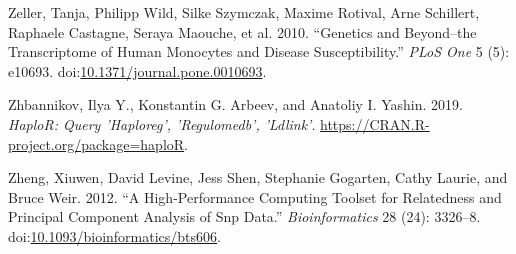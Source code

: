 \documentclass[]{DissertateOSU}
\begin{document}
\hypertarget{ref-Zeller_2010}{}
Zeller, Tanja, Philipp Wild, Silke Szymczak, Maxime Rotival, Arne
Schillert, Raphaele Castagne, Seraya Maouche, et al. 2010. ``Genetics
and Beyond--the Transcriptome of Human Monocytes and Disease
Susceptibility.'' \emph{PLoS One} 5 (5): e10693.
doi:\href{https://doi.org/10.1371/journal.pone.0010693}{10.1371/journal.pone.0010693}.

\hypertarget{ref-haploR}{}
Zhbannikov, Ilya Y., Konstantin G. Arbeev, and Anatoliy I. Yashin. 2019.
\emph{HaploR: Query 'Haploreg', 'Regulomedb', 'Ldlink'}.
\url{https://CRAN.R-project.org/package=haploR}.

\hypertarget{ref-snprelate}{}
Zheng, Xiuwen, David Levine, Jess Shen, Stephanie Gogarten, Cathy
Laurie, and Bruce Weir. 2012. ``A High-Performance Computing Toolset for
Relatedness and Principal Component Analysis of Snp Data.''
\emph{Bioinformatics} 28 (24): 3326--8.
doi:\href{https://doi.org/10.1093/bioinformatics/bts606}{10.1093/bioinformatics/bts606}.

\FloatBarrier
\end{document}
